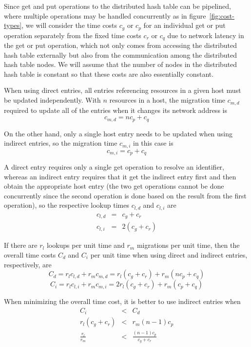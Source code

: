 \documentclass{article}
\begin{document}
Since get and put operations to the distributed hash table can be
pipelined, where multiple operations may be handled concurrently as in
figure~\ref{fig:cost-types}, we will consider the time costs $c_g$ or
$c_p$ for an individual get or put operation separately from the fixed
time costs $c_r$ or $c_q$ due to network latency in the get or put
operation, which not only comes from accessing the distributed hash
table externally but also from the communication among the distributed
hash table nodes.  We will assume that the number of nodes in the
distributed hash table is constant so that these costs are also
essentially constant.

When using direct entries, all entries referencing resources in a
given host must be updated independently.  With $n$ resources in a
host, the migration time $c_{m,d}$ required to update all of the
entries when it changes its network address is
\begin{equation}
  \label{eq:direct-migrate}
  c_{m,d} = n c_p + c_q 
\end{equation}

On the other hand, only a single host entry needs to be updated when
using indirect entries, so the migration time $c_{m,i}$ in this case
is
\begin{equation}
  \label{eq:indirect-migrate}
  c_{m,i} = c_p + c_q
\end{equation}

A direct entry requires only a single get operation to resolve an
identifier, whereas an indirect entry requires that it get the
indirect entry first and then obtain the appropriate host entry (the
two get operations cannot be done concurrently since the second
operation is done based on the result from the first operation), so
the respective lookup times $c_{l,d}$ and $c_{l,i}$ are
\begin{eqnarray*}
  c_{l,d} &=& c_g + c_r \\
  c_{l,i} &=& 2 (c_g + c_r)
\end{eqnarray*}

If there are $r_l$ lookups per unit time and $r_m$ migrations per unit
time, then the overall time costs $C_d$ and $C_i$ per unit time when
using direct and indirect entries, respectively, are
\[C_d = r_l c_{l,d} + r_m c_{m,d} = r_l (c_g + c_r) + r_m (n c_p + c_q) \]
\[C_i = r_l c_{l,i} + r_m c_{m,i} = 2 r_l (c_g + c_r) + r_m(c_p + c_q)\]

When minimizing the overall time cost, it is better to use indirect
entries when
\begin{eqnarray*}
  C_i & < & C_d \\
  r_l (c_g + c_r) & < & r_m (n-1) c_p \\
  \frac{r_l}{r_m} & < & \frac{(n-1)c_p}{c_g + c_r}
\end{eqnarray*}
\end{document}
